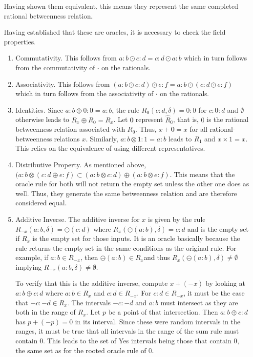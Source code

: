 \documentclass[12pt]{article}
\begin{document}
Having shown them equivalent, this means they represent the same completed rational betweenness relation.

Having established that these are oracles, it is necessary to check the field properties. 
\begin{enumerate}
    \item Commutativity. This follows from $a:b \odot c:d = c:d \odot a:b$ which in turn follows from the commutativity of $\cdot$ on the rationals. 
    \item Associativity. This follows from $(a:b \odot c:d) \odot e:f = a:b \odot (c:d \odot e:f)$ which in turn follows from the associativity of $\cdot$ on the rationals. 
    \item Identities. Since $a:b \oplus 0:0 = a:b$, the rule $R_0 (c:d, \delta) = 0:0$ for $c:0:d$ and $\emptyset$ otherwise leads to $R_x \oplus R_0 = R_x$. Let $0$ represent $\hat{R}_0$, that is, $0$ is the rational betweenness relation associated with $R_0$. Thus, $x + 0 = x$ for all rational-betweenness relations $x$. Similarly, $a:b \otimes 1:1 = a:b$ leads to $R_1$ and $x \times 1 = x$. This relies on the equivalence of using different representatives. 
    \item Distributive Property. As mentioned above, $( a:b \otimes ( c:d \oplus e:f) \subset (a:b \otimes c:d) \oplus (a:b \otimes e:f)$. This means that the oracle rule for both will not return the empty set unless the other one does as well. Thus, they generate the same betweenness relation and are therefore considered equal. 
    \item Additive Inverse.  The additive inverse for $x$ is given by the rule $R_{-x}(a:b, \delta) = \ominus (c:d)$ where $R_x (\ominus (a:b), \delta) = c:d$  and is the empty set if $R_x$ is the empty set for those inputs. It is an oracle basically because the rule returns the empty set in the same conditions as the original rule. For example, if $a:b \in R_{-x}$, then $\ominus (a:b) \in R_x$and thus $R_x(\ominus (a:b), \delta) \neq \emptyset$ implying $R_{-x} (a:b, \delta) \neq \emptyset$.

    To verify that this is the additive inverse, compute $x + (-x)$ by looking at $a:b \oplus c:d$ where $a:b \in R_x$ and $c:d \in R_{-x}$. For $c:d \in R_{-x}$, it must be the case that $-c:-d \in R_x$. The intervals $-c : -d$ and $a:b$ must intersect as they are both in the range of $R_x$. Let $p$ be a point of that intersection. Then $a:b \oplus c:d$ has $p + (-p) =0$ in its interval. Since these were random intervals in the ranges, it must be true that all intervals in the range of the sum rule must contain 0. This leads to the set of Yes intervals being those that contain 0, the same set as for the rooted oracle rule of 0. 
    

\end{enumerate}
\end{document}
